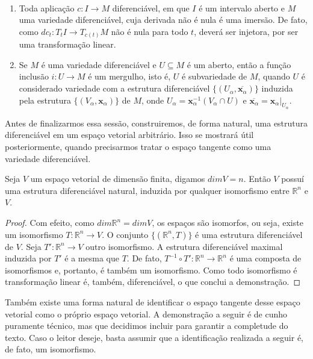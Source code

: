 	\begin{examples}
		\label{ex:imersoes-mergulhos}
		$ $
		\begin{enumerate}
			\item Toda aplicação $c:I\to M$ diferenciável, em que $I$ é um intervalo aberto e $M$ uma variedade diferenciável, cuja derivada não é nula é uma imersão. De fato, como $dc_{t}:T_{t}I\to T_{c(t)}M$ não é nula para todo $t$, deverá ser injetora, por ser uma transformação linear.
			\item Se $M$ é uma variedade diferenciável e $U\subseteq M$ é um aberto, então a função inclusão $i:U\to M$ é um mergulho, isto é, $U$ é subvariedade de $M$, quando $U$ é considerado variedade com a estrutura diferenciável $\{ (U_{\alpha}, \overline{\mathbf{x}_{\alpha}}) \}$ induzida pela estrutura $\{ (V_{\alpha}, \mathbf{x}_{\alpha}) \}$ de $M$, onde $U_{\alpha}=\mathbf{x}_{\alpha}^{-1}(V_{\alpha}\cap U)$ e $\overline{\mathbf{x}_{\alpha}}=\mathbf{x}_{\alpha}|_{U_\alpha}$.
		\end{enumerate}
	\end{examples}
	Antes de finalizarmos essa sessão, construiremos, de forma natural, uma estrutura diferenciável em um espaço vetorial arbitrário. Isso se mostrará útil posteriormente, quando precisarmos tratar o espaço tangente como uma variedade diferenciável.
	\begin{lemma}
		\label{lem:estrutura-diferencial-espaco-vetorial}
		Seja $V$ um espaço vetorial de dimensão finita, digamos $dimV=n$. Então $V$ possuí uma estrutura diferenciável natural, induzida por qualquer isomorfismo entre $\mathbb{R}^{n}$ e $V$.
		\begin{proof}

			Com efeito, como $dim\mathbb{R}^{n}=dimV$, os espaços são isomorfos, ou seja, existe um isomorfismo $T:\mathbb{R}^{n}\to V$. O conjunto $\{ (\mathbb{R}^{n},T) \}$ é uma estrutura diferenciável de $V$.
			Seja $T':\mathbb{R}^{n}\to V$ outro isomorfismo. A estrutura diferenciável maximal induzida por $T'$ é a mesma que $T$. De fato, $T^{-1} \circ T':\mathbb{R}^{n}\to \mathbb{R}^{n}$ é uma composta de isomorfismos e, portanto, é também um isomorfismo. Como todo isomorfismo é transformação linear é, também, diferenciável, o que conclui a demonstração.
		\end{proof}
	\end{lemma}
	Também existe uma forma natural de identificar o espaço tangente desse espaço vetorial como o próprio espaço vetorial. A demonstração a seguir é de cunho puramente técnico, mas que decidimos incluir para garantir a completude do texto. Caso o leitor deseje, basta assumir que a identificação realizada a seguir é, de fato, um isomorfismo.

